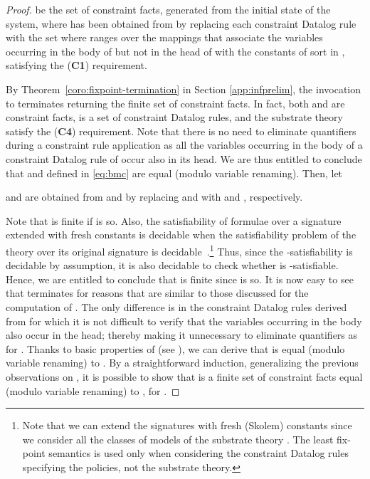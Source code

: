 \documentclass[conference]{llncs}
\begin{document}
{\begin{proof}
be the set of constraint facts, generated from the initial state of the system, 
  where  has been obtained from 
  by replacing each constraint Datalog rule  with the set
   where  ranges over the mappings that
  associate the variables occurring in the body of  but not in the
  head of  with the constants of sort  in , 
  satisfying the (\textbf{C1}) requirement.


By Theorem~\ref{coro:fixpoint-termination} in Section \ref{app:infprelim}, the invocation to
   terminates returning the finite set
   of constraint facts.  
  In fact, both  and  are constraint facts,
   is a set of constraint Datalog rules,
  and the substrate theory  satisfy the (\textbf{C4}) requirement.  
  Note that there is no need to eliminate quantifiers during a constraint rule application as all the variables
  occurring in the body of a constraint Datalog rule of
   occur also in its head.  We are
  thus entitled to conclude that  and 
  defined in \eqref{eq:bmc} are equal (modulo variable
  renaming).  Then, let
  
 
   and  are obtained from  and 
  by replacing  and  with  and ,
  respectively.  
  
  Note that  is finite if 
  is so.  Also, the satisfiability of formulae over a signature
  extended with fresh constants is decidable when the satisfiability
  problem of the theory over its original signature is
  decidable~\cite{TinelliZarba}.\footnote{Note that we can extend
    the signatures with fresh (Skolem) constants since we consider all
    the classes of models of the substrate theory .
    The least fix-point semantics is used only when considering the
    constraint Datalog rules specifying the policies, not the
    substrate theory.}  Thus, since the
  -satisfiability is decidable by assumption, it is
  also decidable to check whether  is
  -satisfiable. Hence, we are entitled to conclude
  that  is finite
  since  is so. It is now easy to see that
   terminates for reasons that are
  similar to those discussed for the computation of .
  The only difference is in the constraint Datalog rules derived from
   for which it is not
  difficult to verify that the variables occurring in the body also
  occur in the head; thereby making it unnecessary to eliminate
  quantifiers as for . Thanks to basic properties of
   (see \cite{constraintdatalog}), we can derive that  is equal
  (modulo variable renaming) to .  By a straightforward
  induction, generalizing the previous observations on ,
  it is possible to show that  is a finite set of
  constraint facts equal (modulo variable renaming) to
  , for .


\end{proof}}
\end{document}
